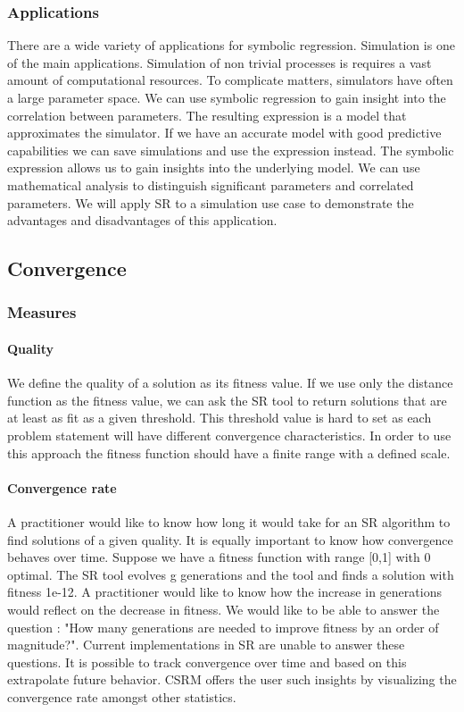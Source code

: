 \subsubsection{Applications}
There are a wide variety of applications for symbolic regression. Simulation is one of the main applications. Simulation of non trivial processes is requires a vast amount of computational resources. To complicate matters, simulators have often a large parameter space.
We can use symbolic regression to gain insight into the correlation between parameters. The resulting expression is a model that approximates the simulator. If we have an accurate model with good predictive capabilities we can save simulations and use the expression instead. The symbolic expression allows us to gain insights into the underlying model. We can use mathematical analysis to distinguish significant parameters and correlated parameters. We will apply SR to a simulation use case to demonstrate the advantages and disadvantages of this application.

\subsection{Convergence}
\subsubsection{Measures}
\paragraph{Quality}
We define the quality of a solution as its fitness value. If we use only the distance function as the fitness value, we can ask the SR tool to return solutions that are at least as fit as a given threshold. This threshold value is hard to set as each problem statement will have different convergence characteristics. In order to use this approach the fitness function should have a finite range with a defined scale. 
\paragraph{Convergence rate}
A practitioner would like to know how long it would take for an SR algorithm to find solutions of a given quality. It is equally important to know how convergence behaves over time. Suppose we have a fitness function with range [0,1] with 0 optimal. The SR tool evolves g generations and the tool and finds a solution with fitness 1e-12. A practitioner would like to know how the increase in generations would reflect on the decrease in fitness. We would like to be able to answer the question : "How many generations are needed to improve fitness by an order of magnitude?". Current implementations in SR are unable to answer these questions. It is possible to track convergence over time and based on this extrapolate future behavior. CSRM offers the user such insights by visualizing the convergence rate amongst other statistics.

